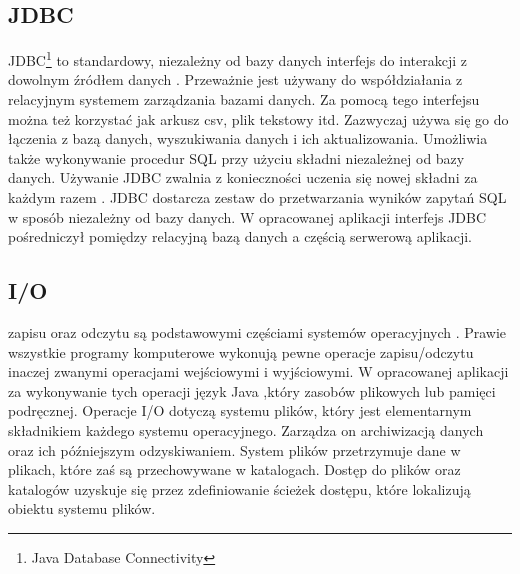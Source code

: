 \documentclass[12pt, twoside]{report}
\begin{document}
\subsection{JDBC}
JDBC\footnote{Java Database Connectivity} to standardowy, niezależny od bazy danych interfejs do interakcji z dowolnym źródłem danych . Przeważnie jest używany do współdziałania z relacyjnym systemem zarządzania bazami danych. Za pomocą tego interfejsu można też korzystać  jak arkusz csv, plik tekstowy itd. Zazwyczaj używa się go do łączenia z bazą danych, wyszukiwania danych i ich aktualizowania. Umożliwia  także wykonywanie procedur SQL  przy użyciu składni niezależnej od bazy danych\cite{jdbc}. Używanie JDBC zwalnia  z konieczności uczenia się nowej składni za każdym razem .  JDBC dostarcza zestaw  do przetwarzania  wyników zapytań SQL w sposób niezależny od bazy danych. W opracowanej aplikacji interfejs JDBC pośredniczył pomiędzy relacyjną bazą danych  a częścią serwerową aplikacji.

\subsection{I/O}
 zapisu oraz odczytu są podstawowymi częściami systemów operacyjnych . Prawie wszystkie programy komputerowe wykonują pewne operacje zapisu/odczytu inaczej zwanymi operacjami wejściowymi i wyjściowymi. W opracowanej aplikacji za wykonywanie tych operacji  język Java ,który zasobów plikowych lub pamięci podręcznej. Operacje I/O dotyczą systemu plików, który jest elementarnym składnikiem każdego systemu operacyjnego. Zarządza on archiwizacją danych oraz ich późniejszym odzyskiwaniem. System plików przetrzymuje dane w plikach, które zaś są przechowywane w katalogach. Dostęp do plików oraz katalogów uzyskuje się przez zdefiniowanie ścieżek dostępu, które lokalizują obiektu systemu plików.\cite{i/o}
\end{document}

